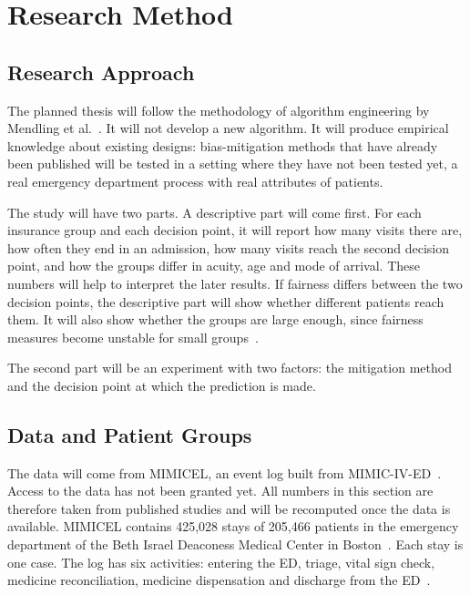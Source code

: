 \section{Research Method}\label{section::method}

\subsection{Research Approach}\label{subsection::approach}

The planned thesis will follow the methodology of algorithm engineering by Mendling et al.~\cite{10.1145/3769071}. It will not develop a new algorithm. It will produce empirical knowledge about existing designs: bias-mitigation methods that have already been published will be tested in a setting where they have not been tested yet, a real emergency department process with real attributes of patients.

The study will have two parts. A descriptive part will come first. For each insurance group and each decision point, it will report how many visits there are, how often they end in an admission, how many visits reach the second decision point, and how the groups differ in acuity, age and mode of arrival. These numbers will help to interpret the later results. If fairness differs between the two decision points, the descriptive part will show whether different patients reach them. It will also show whether the groups are large enough, since fairness measures become unstable for small groups~\cite{sanchezmarques2026addressing}.

The second part will be an experiment with two factors: the mitigation method and the decision point at which the prediction is made.

\subsection{Data and Patient Groups}\label{subsection::data}

The data will come from MIMICEL, an event log built from MIMIC-IV-ED~\cite{wei2023mimicel}. Access to the data has not been granted yet. All numbers in this section are therefore taken from published studies and will be recomputed once the data is available. MIMICEL contains 425,028 stays of 205,466 patients in the emergency department of the Beth Israel Deaconess Medical Center in Boston~\cite{wei2025curation,lett2025intersectional}. Each stay is one case. The log has six activities: entering the ED, triage, vital sign check, medicine reconciliation, medicine dispensation and discharge from the ED~\cite{wei2025curation}.

